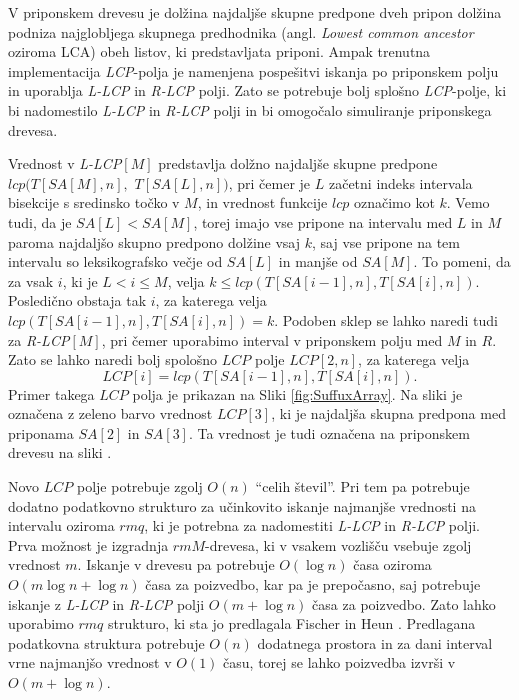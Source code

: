 V priponskem drevesu je dolžina najdaljše skupne predpone dveh pripon dolžina podniza najglobljega skupnega predhodnika (angl. \textit{Lowest common ancestor} oziroma LCA) obeh listov, ki predstavljata priponi. Ampak trenutna implementacija \textit{LCP}-polja je namenjena pospešitvi iskanja po priponskem polju in uporablja \textit{L-LCP} in \textit{R-LCP} polji. Zato se potrebuje bolj splošno \textit{LCP}-polje, ki bi nadomestilo \textit{L-LCP} in \textit{R-LCP} polji in bi omogočalo simuliranje priponskega drevesa.

Vrednost v \textit{L-LCP}$[M]$ predstavlja dolžno najdaljše skupne predpone $lcp(T[SA[M], n],$ $T[SA[L], n])$, pri čemer je $L$ začetni indeks intervala bisekcije s sredinsko točko v $M$, in vrednost funkcije $lcp$ označimo kot $k$. Vemo tudi, da je $SA[L]<SA[M]$, torej imajo vse pripone na intervalu med $L$ in $M$ paroma najdaljšo skupno predpono dolžine vsaj $k$, saj vse pripone na tem intervalu so leksikografsko večje od $SA[L]$ in manjše od $SA[M]$. To pomeni, da za vsak $i$, ki je $L<i\le M$, velja $k\le lcp(T[SA[i-1], n], T[SA[i], n])$. Posledično obstaja tak $i$, za katerega velja $lcp(T[SA[i-1], n], T[SA[i], n])=k$. Podoben sklep se lahko naredi tudi za \textit{R-LCP}$[M]$, pri čemer uporabimo interval v priponskem polju med $M$ in $R$. Zato se lahko naredi bolj spološno $LCP$ polje $LCP[2,n]$, za katerega velja
$$
    LCP[i]=lcp(T[SA[i-1], n], T[SA[i], n]).
$$
Primer takega $LCP$ polja je prikazan na Sliki \ref{fig:SuffuxArray}. Na sliki je označena z zeleno barvo vrednost $LCP[3]$, ki je najdaljša skupna predpona med priponama $SA[2]$ in $SA[3]$. Ta vrednost je tudi označena na priponskem drevesu na sliki \cite{Abouelhoda2004, Kasai2001}.

Novo $LCP$ polje potrebuje zgolj $O(n)$ \enquote{celih števil}. Pri tem pa potrebuje dodatno podatkovno strukturo za učinkovito iskanje najmanjše vrednosti na intervalu oziroma $rmq$, ki je potrebna za nadomestiti \textit{L-LCP} in \textit{R-LCP} polji. Prva možnost je izgradnja $rmM$-drevesa, ki v vsakem vozlišču vsebuje zgolj vrednost $m$. Iskanje v drevesu pa potrebuje $O(\log{n})$ časa oziroma $O(m\log{n}+\log{n})$ časa za poizvedbo, kar pa je prepočasno, saj potrebuje iskanje z \textit{L-LCP} in \textit{R-LCP} polji $O(m+\log{n})$ časa za poizvedbo. Zato lahko uporabimo $rmq$ strukturo, ki sta jo predlagala Fischer in Heun \cite{Fischer2007}. Predlagana podatkovna struktura potrebuje $O(n)$ dodatnega prostora in za dani interval vrne najmanjšo vrednost v $O(1)$ času, torej se lahko poizvedba izvrši v $O(m+\log{n})$.

